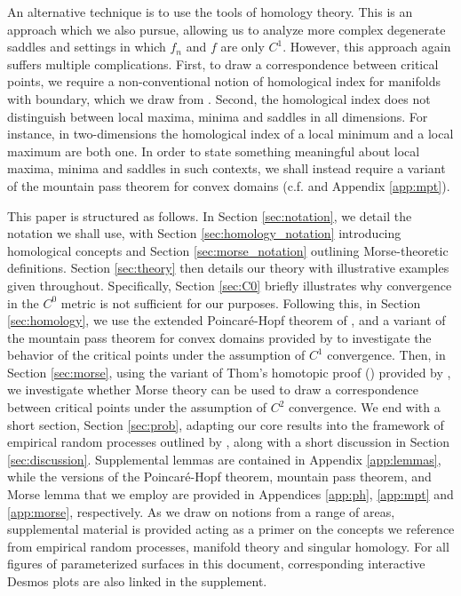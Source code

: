 \documentclass[11pt]{article}
\newcommand{\1}{\mathbf{1}}
\theoremstyle{definition}
\theoremstyle{remark}
\begin{document}
An alternative technique is to use the tools of homology theory. This is an approach which we also pursue, allowing us to analyze more complex degenerate saddles and settings in which $f_n$ and $f$ are only $C^1$. However, this approach again suffers multiple complications. First, to draw a correspondence between critical points, we require a non-conventional notion of homological index for manifolds with boundary, which we draw from \cite{jubin2009generalized}. Second, the homological index does not distinguish between local maxima, minima and saddles in all dimensions. For instance, in two-dimensions the homological index of a local minimum and a local maximum are both one. In order to state something meaningful about local maxima, minima and saddles in such contexts, we shall instead require a variant of the mountain pass theorem for convex domains (c.f. \cite{Jabri_2003} and Appendix \ref{app:mpt}). 


This paper is structured as follows. In Section \ref{sec:notation}, we detail the notation we shall use, with Section \ref{sec:homology_notation} introducing homological concepts and Section \ref{sec:morse_notation} outlining Morse-theoretic definitions. Section \ref{sec:theory} then details our theory with illustrative examples given throughout. Specifically, Section \ref{sec:C0} briefly illustrates why convergence in the $C^0$ metric is not sufficient for our purposes. Following this, in Section \ref{sec:homology}, we use the extended Poincar\'{e}-Hopf theorem of \cite{jubin2009generalized}, and a variant of the mountain pass theorem for convex domains provided by \cite{Jabri_2003} to investigate the behavior of the critical points under the assumption of $C^1$ convergence. Then, in Section \ref{sec:morse}, using the variant of Thom's homotopic proof (\cite{arnold1985singularities}) provided by \cite{ioffe1997}, we investigate whether Morse theory can be used to draw a correspondence between critical points under the assumption of $C^2$ convergence. We end with a short section, Section \ref{sec:prob}, adapting our core results into the framework of empirical random processes outlined by \cite{van1996weak}, along with a short discussion in Section \ref{sec:discussion}. Supplemental lemmas are contained in Appendix \ref{app:lemmas}, while the versions of the Poincar\'{e}-Hopf theorem, mountain pass theorem, and Morse lemma that we employ are provided in Appendices \ref{app:ph}, \ref{app:mpt} and \ref{app:morse}, respectively. As we draw on notions from a range of areas, supplemental material is provided acting as a primer on the concepts we reference from empirical random processes, manifold theory and singular homology. For all figures of parameterized surfaces in this document, corresponding interactive Desmos plots are also linked in the supplement.
\end{document}
